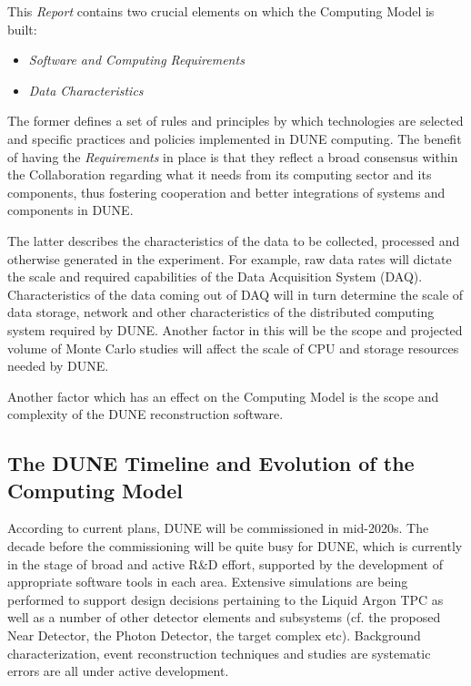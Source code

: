 This \textit{Report} contains two crucial elements on which the Computing Model is built:
\begin{itemize}
\item \textit{Software and Computing Requirements}
\item \textit{Data Characteristics}
\end{itemize}

The former defines a set of rules and principles by which technologies are selected and specific practices and policies implemented in DUNE computing.
The benefit of having the \textit{Requirements} in place is that they reflect a broad consensus within the Collaboration regarding what it needs from
its computing sector and its components, thus fostering cooperation and better integrations of systems and components in DUNE.

The latter describes the characteristics of the data to be collected, processed and otherwise generated in the experiment.
For example, raw data rates will dictate the scale and required capabilities of the Data Acquisition System (DAQ). 
Characteristics of the data coming out of DAQ will in turn determine the scale of data storage, network and other characteristics of the
distributed computing system required by DUNE. Another factor in this will be the scope and projected volume of Monte Carlo studies 
will affect the scale of CPU and storage resources needed by DUNE.

Another factor which has an effect on the Computing Model is the scope and complexity of the DUNE reconstruction software.



\subsection{The DUNE Timeline and Evolution of the Computing Model}
According to current plans, DUNE will be commissioned in mid-2020s. The decade before the commissioning will be quite busy
for DUNE, which is currently in the stage of broad and active R\&D effort, supported by the development of appropriate 
software tools in each area. Extensive simulations are being performed to support design decisions pertaining to the Liquid 
Argon TPC as well as a number of other detector elements and subsystems (cf. the proposed Near Detector, the Photon Detector, 
the target complex etc). Background characterization, event reconstruction techniques and studies are systematic errors are all under active development.

